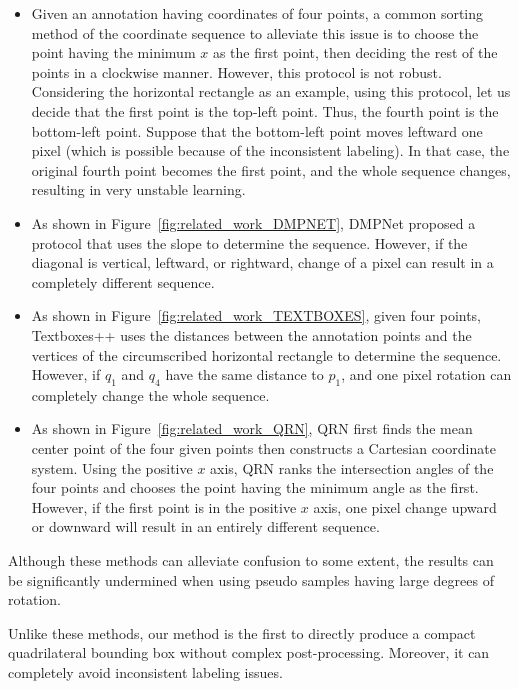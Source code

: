 \begin{itemize}
    \item Given an annotation having coordinates of four points, a common sorting method of the coordinate sequence to alleviate this issue is to choose the point having the minimum $x$ as the first point, then deciding the rest of the points in a clockwise manner. However, this protocol is not robust. 
    Considering the horizontal rectangle as an example, using this protocol, let us decide that the first point is the top-left point. Thus, the fourth point is the bottom-left point. Suppose
    that
    the bottom-left point moves leftward one pixel (which is possible because of the inconsistent labeling). In that case, the original fourth point becomes the first point, and the whole sequence changes, resulting in very unstable learning. 
    
    \item As shown in Figure~\ref{fig:related_work_DMPNET}, DMPNet \cite{liu2017deep} proposed a protocol that uses the slope to determine the sequence. However, if the diagonal is vertical, leftward, or rightward,  change
    of a pixel
    can result in a completely different sequence.
    
    \item As shown in Figure~\ref{fig:related_work_TEXTBOXES}, given four points, Textboxes++ \cite{liao2018textboxes++} uses the distances between the annotation points and the vertices of the circumscribed horizontal rectangle to {determine} the sequence. However, if $q_1$ and $q_4$ have the same distance to $p_1$, and one pixel rotation can completely change the whole sequence. 
    \item As shown in Figure~\ref{fig:related_work_QRN}, QRN \cite{he2018end} first finds the mean center point of the four given points then constructs a Cartesian coordinate system. Using the positive $x$ axis, QRN ranks the intersection angles of the four points and chooses the point having the minimum angle as the first. However, if the first point is in the positive $x$ axis, one pixel change upward or downward will result in an entirely different sequence.
\end{itemize}
Although these methods \cite{liu2017deep,liao2018textboxes++,he2018end} can alleviate  confusion to some extent, the results can be significantly undermined when using pseudo samples having large degrees of rotation. 

Unlike these methods, our method is the first to directly produce a compact quadrilateral bounding box without complex post-processing. Moreover, it can completely avoid inconsistent labeling issues.

